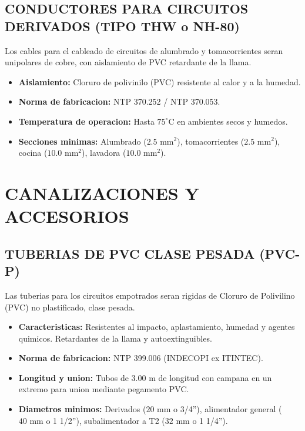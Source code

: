 \subsection{CONDUCTORES PARA CIRCUITOS DERIVADOS (TIPO THW o NH-80)}
Los cables para el cableado de circuitos de alumbrado y tomacorrientes seran unipolares de cobre, con aislamiento de PVC retardante de la llama.
\begin{itemize}
  \item \textbf{Aislamiento:} Cloruro de polivinilo (PVC) resistente al calor y a la humedad.
  \item \textbf{Norma de fabricacion:} NTP 370.252 / NTP 370.053.
  \item \textbf{Temperatura de operacion:} Hasta \(75^\circ\text{C}\) en ambientes secos y humedos.
  \item \textbf{Secciones minimas:} Alumbrado (\(2.5\text{ mm}^2\)), tomacorrientes (\(2.5\text{ mm}^2\)), cocina (\(10.0\text{ mm}^2\)), lavadora (\(10.0\text{ mm}^2\)).
\end{itemize}

\section{CANALIZACIONES Y ACCESORIOS}

\subsection{TUBERIAS DE PVC CLASE PESADA (PVC-P)}
Las tuberias para los circuitos empotrados seran rigidas de Cloruro de Polivilino (PVC) no plastificado, clase pesada.
\begin{itemize}
  \item \textbf{Caracteristicas:} Resistentes al impacto, aplastamiento, humedad y agentes quimicos. Retardantes de la llama y autoextinguibles.
  \item \textbf{Norma de fabricacion:} NTP 399.006 (INDECOPI ex ITINTEC).
  \item \textbf{Longitud y union:} Tubos de 3.00 m de longitud con campana en un extremo para union mediante pegamento PVC.
  \item \textbf{Diametros minimos:} Derivados (\(20\text{ mm}\) o 3/4''), alimentador general (\(40\text{ mm}\) o 1 1/2''), subalimentador a T2 (\(32\text{ mm}\) o 1 1/4'').
\end{itemize}

